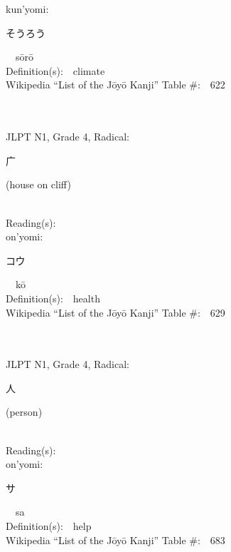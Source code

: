 \begin{multicols}{2}
{\hspace*{1em}}kun'yomi:\ \ \\
{\hspace*{2em}}{\begin{CJK}{UTF8}{min} そうろう \end{CJK}}\ \ s\=or\=o\ \ \\
Definition(s):\ \ climate \\
Wikipedia ``List of the J\=oy\=o Kanji'' Table \#:\ \ 622 \\
\ \ \\
{\fontsize{34pt}{40pt}  }\ \ \\  %
{JLPT N1, Grade 4, Radical:\ \ {\begin{CJK}{UTF8}{min} 广 \end{CJK}} (house on cliff) } \\
Reading(s):\ \ \\
{\hspace*{1em}}on'yomi:\ \ \\
{\hspace*{2em}}{\begin{CJK}{UTF8}{min} コウ \end{CJK}}\ \ k\=o\ \ \\
Definition(s):\ \ health \\
Wikipedia ``List of the J\=oy\=o Kanji'' Table \#:\ \ 629 \\
\ \ \\
{\fontsize{34pt}{40pt}  }\ \ \\  %
{JLPT N1, Grade 4, Radical:\ \ {\begin{CJK}{UTF8}{min} 人 \end{CJK}} (person) } \\
Reading(s):\ \ \\
{\hspace*{1em}}on'yomi:\ \ \\
{\hspace*{2em}}{\begin{CJK}{UTF8}{min} サ \end{CJK}}\ \ sa\ \ \\
Definition(s):\ \ help \\
Wikipedia ``List of the J\=oy\=o Kanji'' Table \#:\ \ 683 \\

\end{multicols}
